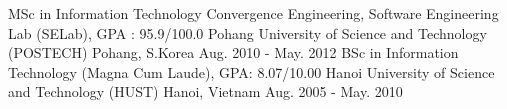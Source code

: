 \begin{cventries}
  \cventry
  {MSc in Information Technology Convergence Engineering, {Software Engineering Lab (SELab)}, GPA : 95.9/100.0} %
  {Pohang University of Science and Technology (POSTECH)} %
  {Pohang, S.Korea} %
  {Aug. 2010 - May. 2012} %
  {
  }
  \vspace{-3mm}
  \cventry
  { BSc in Information Technology (Magna Cum Laude), GPA: 8.07/10.00 } %
  {Hanoi University of Science and Technology (HUST)} %
  {Hanoi, Vietnam} %
  {Aug. 2005 - May. 2010} %
  {
  }  

\end{cventries}





